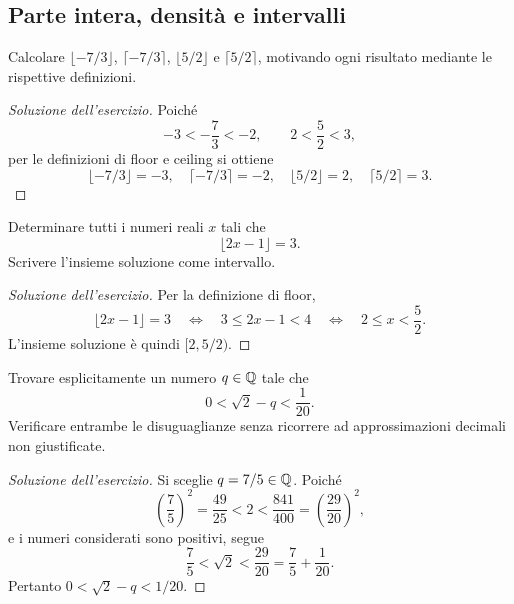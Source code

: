 \subsection{Parte intera, densità e intervalli}
\label{sec:esercizi-fondamenti-parte-intera}

\begin{exercise}
\label{ex:fondamenti-floor-ceiling-negativi}
Calcolare $\lfloor-7/3\rfloor$, $\lceil-7/3\rceil$,
$\lfloor5/2\rfloor$ e $\lceil5/2\rceil$, motivando ogni
risultato mediante le rispettive definizioni.
\end{exercise}
\begin{proof}[Soluzione dell'esercizio]
Poiché
\[
  -3<-\frac73<-2,
  \qquad 2<\frac52<3,
\]
per le definizioni di floor e ceiling si ottiene
\[
  \lfloor-7/3\rfloor=-3,\quad
  \lceil-7/3\rceil=-2,\quad
  \lfloor5/2\rfloor=2,\quad
  \lceil5/2\rceil=3.
\]
\end{proof}

\begin{exercise}
\label{ex:fondamenti-equazione-parte-intera}
Determinare tutti i numeri reali $x$ tali che
\[
  \lfloor2x-1\rfloor=3.
\]
Scrivere l'insieme soluzione come intervallo.
\end{exercise}
\begin{proof}[Soluzione dell'esercizio]
Per la definizione di floor,
\[
  \lfloor2x-1\rfloor=3
  \quad\Longleftrightarrow\quad
  3\le2x-1<4
  \quad\Longleftrightarrow\quad
  2\le x<\frac52.
\]
L'insieme soluzione è quindi $[2,5/2)$.
\end{proof}

\begin{exercise}
\label{ex:fondamenti-approssimazione-razionale-irrazionale}
Trovare esplicitamente un numero $q\in\mathbb{Q}$ tale che
\[
  0<\sqrt2-q<\frac1{20}.
\]
Verificare entrambe le disuguaglianze senza ricorrere
ad approssimazioni decimali non giustificate.
\end{exercise}
\begin{proof}[Soluzione dell'esercizio]
Si sceglie $q=7/5\in\mathbb{Q}$. Poiché
\[
  \left(\frac75\right)^2=\frac{49}{25}<2
  <\frac{841}{400}=\left(\frac{29}{20}\right)^2,
\]
e i numeri considerati sono positivi, segue
\[
  \frac75<\sqrt2<\frac{29}{20}
  =\frac75+\frac1{20}.
\]
Pertanto $0<\sqrt2-q<1/20$.
\end{proof}

